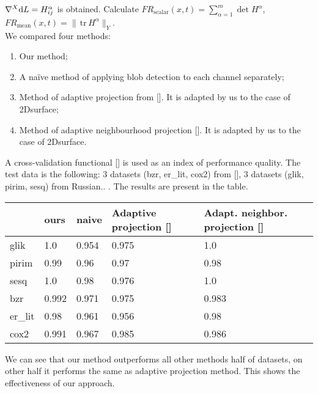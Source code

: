 \documentclass{llncs}
\newcommand{\CovariantDiffManif}[1]{\nabla^{#1}}
\newcommand{\Diff}{\mathrm{d}}
\newcommand{\FRScalar}{FR_{\mathrm{scalar}}}
\newcommand{\FRMean}{FR_{\mathrm{mean}}}
\newcommand {\tr}{{\,}\mathrm{tr}{\,}}
\begin{document}
	$\CovariantDiffManif{X} \Diff L=\tensor*{H}{_i_j^\alpha}$ is obtained. Calculate $\FRScalar(x,t)=\sum_{\alpha=1}^{m}\det H^{\alpha}$, 
	$\FRMean(x,t)=\|\tr H^{\alpha}\|_Y$.	
\\
We compared four methods: 
\begin{enumerate}
\item	Our method;
\item	A naïve method of applying blob detection to each channel separately;
\item	Method of adaptive projection from []. It is adapted by us to the case of 2Dsurface;
\item	Method of adaptive neighbourhood projection []. It is adapted by us to the case of 2Dsurface.
\end{enumerate}
A cross-validation functional [] is used as an index of performance quality. The test data is the following: 3 datasets (bzr, er\_lit, cox2) from [], 3 datasets (glik, pirim, sesq) from Russian..  . The results are present in the table.

\begin{center}
  \begin{tabular}{| l | l | l | l | l |}
    \hline
		 & ours & naive & Adaptive projection [] &	Adapt. neighbor. projection [] \\ \hline
		glik	& 1.0 &	0.954 &	0.975 &	1.0 \\ \hline
		pirim	& 0.99 & 0.96 &	0.97 &	0.98 \\ \hline
		sesq	& 1.0 &	0.98 &	0.976 &	1.0 \\ \hline
		bzr	& 0.992 &	0.971 &	0.975 &	0.983 \\ \hline
		er\_lit & 0.98 &	0.961 &	0.956 &	0.98 \\ \hline
		cox2 & 0.991 & 0.967 & 0.985 &	0.986 \\ \hline    
  \end{tabular}
\end{center}
We can see that our method outperforms all other methods half of datasets, on other half it performs the same as adaptive projection method. This shows the effectiveness of our approach. 
\end{document}
